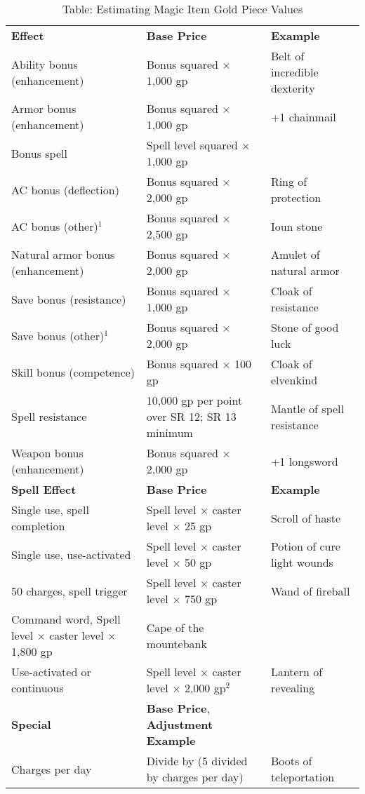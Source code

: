 \begin{table}[]
\sffamily
\caption{Table: Estimating Magic Item Gold Piece Values}
\begin{tabular}{lll}
\textbf{Effect} & \textbf{Base Price} & \textbf{Example}\\
Ability bonus (enhancement) & Bonus squared $\times$ 1,000 gp & Belt of incredible dexterity \\
 Armor bonus (enhancement) & Bonus squared $\times$ 1,000 gp & +1 chainmail \\
 Bonus spell & Spell level squared $\times$ 1,000 gp &   \\
 AC bonus (deflection) & Bonus squared $\times$ 2,000 gp & Ring of protection \\
 AC bonus (other)\(^{1}\) & Bonus squared $\times$ 2,500 gp & Ioun stone \\
 Natural armor bonus (enhancement) & Bonus squared $\times$ 2,000 gp & Amulet of natural armor \\
 Save bonus (resistance) & Bonus squared $\times$ 1,000 gp & Cloak of resistance \\
 Save bonus (other)\(^{1}\) & Bonus squared $\times$ 2,000 gp & Stone of good luck \\
 Skill bonus (competence) & Bonus squared $\times$ 100 gp & Cloak of elvenkind \\
 Spell resistance & 10,000 gp per point over SR 12; SR 13 minimum & Mantle of spell resistance \\
 Weapon bonus (enhancement) & Bonus squared $\times$ 2,000 gp & +1 longsword\\
\textbf{Spell Effect} &  \textbf{Base Price} & \textbf{Example}\\
Single use, spell completion & Spell level $\times$ caster level $\times$ 25 gp & Scroll of haste \\
 Single use, use-activated & Spell level $\times$ caster level $\times$ 50 gp & Potion of cure light wounds \\
 50 charges, spell trigger & Spell level $\times$ caster level $\times$ 750 gp & Wand of fireball \\
 Command word, Spell level $\times$ caster level $\times$ 1,800 gp & Cape of the mountebank \\
 Use-activated or continuous & Spell level $\times$ caster level $\times$ 2,000 gp\(^{2}\) & Lantern of revealing\\
\textbf{Special} & \textbf{Base Price}, \textbf{Adjustment Example}\\
Charges per day & Divide by (5 divided by charges per day) & Boots of teleportation \\

\end{tabular}
\end{table}
